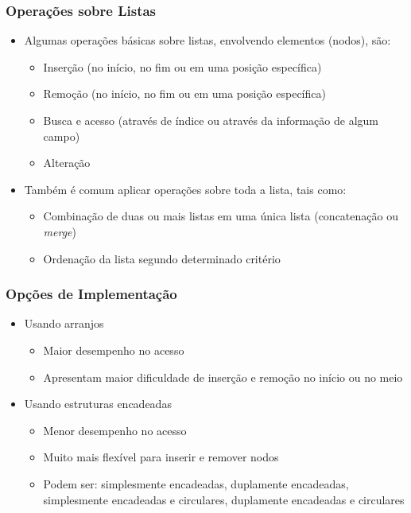 \documentclass[aspectratio=169]{beamer}
\begin{document}
\begin{frame}\frametitle{Operações sobre Listas}
\begin{itemize}
	\item Algumas operações básicas sobre listas, envolvendo elementos (nodos), são:
	\begin{itemize}
		\item Inserção (no início, no fim ou em uma posição específica)
		\item Remoção (no início, no fim ou em uma posição específica)
		\item Busca e acesso (através de índice ou através da informação de algum campo)
		\item Alteração
	\end{itemize}
	\item Também é comum aplicar operações sobre toda a lista, tais como:
	\begin{itemize}
		\item Combinação de duas ou mais listas em uma única lista (concatenação ou \emph{merge})
		\item Ordenação da lista segundo determinado critério
	\end{itemize}
\end{itemize}
\end{frame}

\begin{frame}\frametitle{Opções de Implementação}
\begin{itemize}
	\item Usando arranjos
	\begin{itemize}
		\item Maior desempenho no acesso
		\item Apresentam maior dificuldade de inserção e remoção no início ou no meio
	\end{itemize}
	\item Usando estruturas encadeadas
	\begin{itemize}
		\item Menor desempenho no acesso
		\item Muito mais flexível para inserir e remover nodos
		\item Podem ser: simplesmente encadeadas, duplamente encadeadas, simplesmente encadeadas e circulares, duplamente encadeadas e circulares
	\end{itemize}
\end{itemize}
\end{frame}
\end{document}
